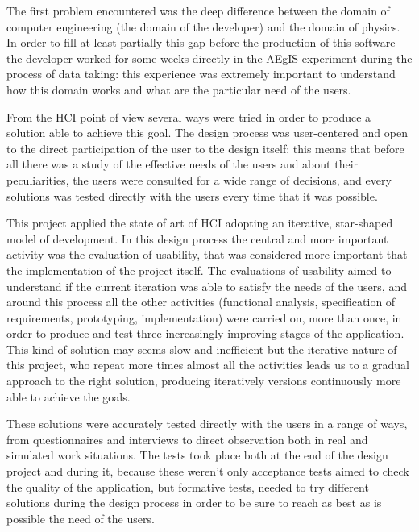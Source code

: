 The first problem encountered was the deep difference between the domain of computer engineering (the domain of the developer) and the domain of physics. In order to fill at least partially this gap before the production of this software the developer worked for some weeks directly in the AEgIS experiment during the process of data taking: this experience was extremely important to understand how this domain works and what are the particular need of the users.

From the HCI point of view several ways were tried in order to produce a solution able to achieve this goal. 
The design process was user-centered and open to the direct participation of the user to the design itself: this means that before all there was a study of the effective needs of the users and about their peculiarities, the users were consulted for a wide range of decisions, and every solutions was tested directly with the users every time that it was possible. 
  
This project applied the state of art of HCI adopting an iterative, star-shaped model of development. In this design process the central and more important activity was the evaluation of usability, that was considered more important that the implementation of the project itself. The evaluations of usability aimed to understand if the current iteration was able to satisfy the needs of the users, and around this process all the other activities (functional analysis, specification of requirements, prototyping, implementation) were carried on, more than once, in order to produce and test three increasingly improving stages of the application. 
This kind of solution may seems slow and inefficient but the iterative nature of this project, who repeat more times almost all the activities leads us to a gradual approach to the right solution, producing iteratively versions continuously more able to achieve the goals.

These solutions were accurately tested directly with the users in a range of ways, from questionnaires and interviews to direct observation both in real and simulated work situations.
The tests took place both at the end of the design project and during it, because these weren't only acceptance tests aimed to check the quality of the application, but formative tests, needed to try different solutions during the design process in order to be sure to reach as best as is possible the need of the users.

